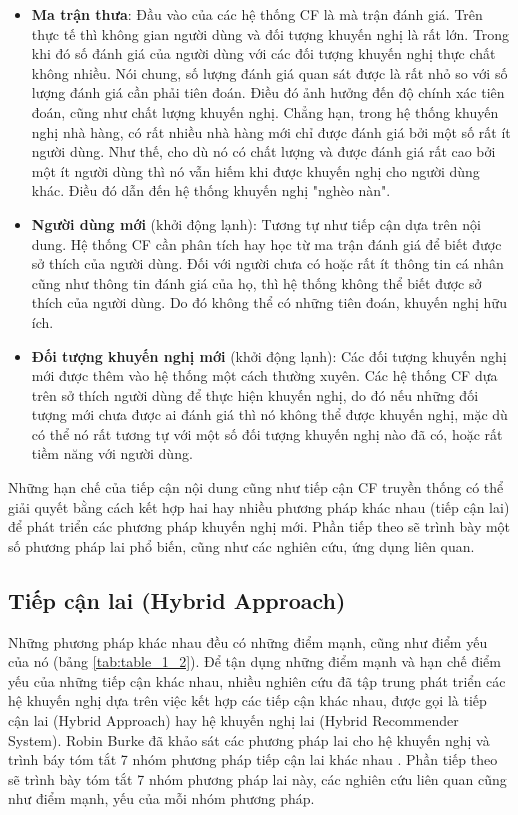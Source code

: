\begin{itemize}
\item \textbf{Ma trận thưa}: Đầu vào của các hệ thống CF là mà trận đánh giá. Trên thực tế thì không gian người dùng và đối tượng khuyến nghị là rất lớn. Trong khi đó số đánh giá của người dùng với các đối tượng khuyến nghị thực chất không nhiều. Nói chung, số lượng đánh giá quan sát được là rất nhỏ so với số lượng đánh giá cần phải tiên đoán. Điều đó ảnh hưởng đến độ chính xác tiên đoán, cũng như chất lượng khuyến nghị. Chẳng hạn, trong hệ thống khuyến nghị nhà hàng, có rất nhiều nhà hàng mới chỉ được đánh giá bởi một số rất ít người dùng. Như thế, cho dù nó có chất lượng và được đánh giá rất cao bởi một ít người dùng thì nó vẫn hiếm khi được khuyến nghị cho người dùng khác. Điều đó dẫn đến hệ thống khuyến nghị "nghèo nàn".
\item \textbf{Người dùng mới} (khởi động lạnh): Tương tự như tiếp cận dựa trên nội dung. Hệ thống CF cần phân tích hay học từ ma trận đánh giá để biết được sở thích của người dùng. Đối với người chưa có hoặc rất ít thông tin cá nhân cũng như thông tin đánh giá của họ, thì hệ thống không thể biết được sở thích của người dùng. Do đó không thể có những tiên đoán, khuyến nghị hữu ích.
\item \textbf{Đối tượng khuyến nghị mới} (khởi động lạnh): Các đối tượng khuyến nghị mới được thêm vào hệ thống một cách thường xuyên. Các hệ thống CF dựa trên sở thích người dùng để thực hiện khuyến nghị, do đó nếu những đối tượng mới chưa được ai đánh giá thì nó không thể được khuyến nghị, mặc dù có thể nó rất tương tự với một số đối tượng khuyến nghị nào đã có, hoặc rất tiềm năng với người dùng. 
\end{itemize}

Những hạn chế của tiếp cận nội dung cũng như tiếp cận CF truyền thống có thể giải quyết bằng cách kết hợp hai hay nhiều phương pháp khác nhau (tiếp cận lai) để phát triển các phương pháp khuyến nghị mới. Phần tiếp theo sẽ trình bày một số phương pháp lai phổ biến, cũng như các nghiên cứu, ứng dụng liên quan. 

\subsection{Tiếp cận lai (Hybrid Approach)}
Những phương pháp khác nhau đều có những điểm mạnh, cũng như điểm yếu của nó (bảng \ref{tab:table_1_2}). Để tận dụng những điểm mạnh và hạn chế điểm yếu của những tiếp cận khác nhau, nhiều nghiên cứu đã tập trung phát triển các hệ khuyến nghị dựa trên việc kết hợp các tiếp cận khác nhau, được gọi là tiếp cận lai (Hybrid Approach) hay hệ khuyến nghị lai (Hybrid Recommender System). Robin Burke đã khảo sát các phương pháp lai cho hệ khuyến nghị và trình báy tóm tắt 7 nhóm phương pháp tiếp cận lai khác nhau \cite{Robin:2002:HybridRS_Survey}. Phần tiếp theo sẽ trình bày tóm tắt 7 nhóm phương pháp lai này, các nghiên cứu liên quan cũng như điểm mạnh, yếu của mỗi nhóm phương pháp.

